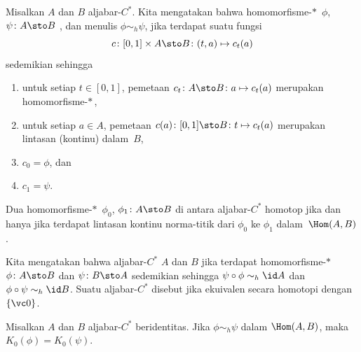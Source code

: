 \begin{defn} Misalkan $A$ dan $B$ aljabar-$C^*$. Kita mengatakan bahwa homomorfisme-$*\,$ $\phi$, $\psi\colon A \sto B$
, dan menulis $\phi \sim_h \psi$, jika terdapat suatu fungsi
   \[ c\colon [0,1] \times A \sto B\colon (t,a) \mapsto c_t(a) \]
sedemikian sehingga
  \begin{enumerate}[label=\rm{(\alph*)}]
     \item untuk setiap $t \in [0,1]$, pemetaan $c_t\colon A \sto B \colon a \mapsto c_t(a)$ merupakan homomorfisme-$*\,$,
     \item untuk setiap $a \in A$, pemetaan $c(a)\colon [0,1] \sto B\colon t \mapsto c_t(a)$ merupakan lintasan (kontinu) dalam~$B$,
     \item $c_0 = \phi$, dan
     \item $c_1 = \psi$.
  \end{enumerate}
\end{defn}

\begin{prop} Dua homomorfisme-$*\,$ $\phi_0$, $\phi_1\colon A \sto B$ di antara aljabar-$C^*$
homotop jika dan hanya jika terdapat lintasan kontinu norma-titik dari $\phi_0$ ke $\phi_1$ dalam~$\Hom(A,B)$.
\end{prop}

\begin{defn} Kita mengatakan bahwa aljabar-$C^*$ $A$ dan $B$
 jika terdapat homomorfisme-$*\,$ $\phi\colon A \sto B$ dan $\psi\colon B \sto A$ sedemikian sehingga $\psi
\circ \phi \sim_h \id A$ dan $\phi \circ \psi \sim_h \id B$. Suatu aljabar-$C^*$ disebut
 jika ekuivalen secara homotopi dengan~$\{\vc 0\}$.
\end{defn}

\begin{prop}\label{0062327} Misalkan $A$ dan $B$ aljabar-$C^*$ beridentitas. Jika $\phi \sim_h \psi$
dalam $\Hom(A,B)$, maka $K_0(\phi) = K_0(\psi)$.
\end{prop}


